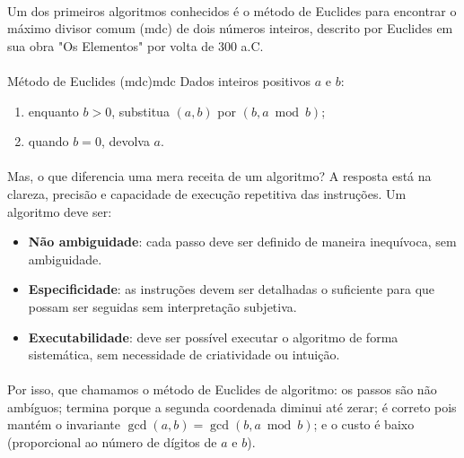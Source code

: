 \documentclass[12pt,a4paper]{article}
\def\emph#1{#1}%
\begin{document}
\paragraph{}
Um dos primeiros algoritmos conhecidos é o \emph{método de Euclides} para encontrar o máximo divisor comum (mdc) de dois números inteiros, descrito por Euclides em sua obra "Os Elementos" por volta de 300 a.C. 

\paragraph{}
\begin{algobox}{Método de Euclides (mdc)}{mdc}
Dados inteiros positivos $a$ e $b$:
\begin{enumerate}\setlength{\itemsep}{2pt}
    \item enquanto $b>0$, substitua $(a,b)$ por $(b, a\bmod b)$;
    \item quando $b=0$, devolva $a$.
\end{enumerate}
\end{algobox}

\paragraph{}
Mas, o que diferencia uma mera receita de um algoritmo? A resposta está na clareza, precisão e capacidade de execução repetitiva das instruções. Um algoritmo deve ser:
\begin{itemize}\setlength{\itemsep}{2pt}
    \item \textbf{Não ambiguidade}: cada passo deve ser definido de maneira inequívoca, sem ambiguidade.
    \item \textbf{Especificidade}: as instruções devem ser detalhadas o suficiente para que possam ser seguidas sem interpretação subjetiva.
    \item \textbf{Executabilidade}: deve ser possível executar o algoritmo de forma sistemática, sem necessidade de criatividade ou intuição.
\end{itemize}

\paragraph{}
Por isso, que chamamos o método de Euclides de algoritmo: os passos são não ambíguos; termina porque a segunda coordenada diminui até zerar; é correto pois mantém o invariante $\gcd(a,b)=\gcd(b,a\bmod b)$; e o custo é baixo (proporcional ao número de dígitos de $a$ e $b$).
\end{document}

